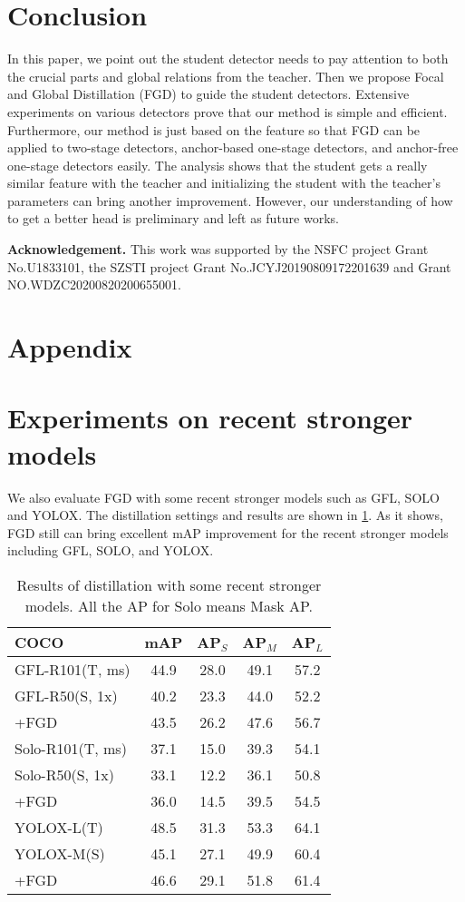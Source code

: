 \documentclass[10pt,twocolumn,letterpaper]{article}
\begin{document}
\section{Conclusion}
\label{sec:conclusion}
In this paper, we point out the student detector needs to pay attention to both the crucial parts and global relations from the teacher. Then we propose Focal and Global Distillation (FGD) to guide the student detectors. Extensive experiments on various detectors prove that our method is simple and efficient. Furthermore, our method is just based on the feature so that FGD can be applied to two-stage detectors, anchor-based one-stage detectors, and anchor-free one-stage detectors easily. The analysis shows that the student gets a really similar feature with the teacher and initializing the student with the teacher's parameters can bring another improvement. However, our understanding of how to get a better head is preliminary and left as future works. 

{\bf Acknowledgement.} This work was supported by the NSFC project Grant No.U1833101, the SZSTI project Grant No.JCYJ20190809172201639 and Grant NO.WDZC20200820200655001.


{\small


}

\clearpage
\appendix
\section*{Appendix}
\section{Experiments on recent stronger models}
We also evaluate FGD with some recent stronger models such as GFL\cite{li2020generalized}, SOLO\cite{wang2020solo} and YOLOX\cite{ge2021yolox}. The distillation settings and results are shown in \cref{table:extra results}. As it shows, FGD still can bring excellent mAP improvement for the recent stronger models including GFL, SOLO, and YOLOX.
\begin{table}
  \centering
  \begin{tabular}{l|cccc}
    \toprule
    {\bf COCO} & mAP & AP$_{S}$ & AP$_{M}$ & AP$_{L}$\\
    \midrule
    GFL-R101(T, ms) & 44.9 &28.0&49.1&57.2\\
    GFL-R50(S, 1x) & 40.2 &23.3&44.0&52.2\\
    +FGD & 43.5&26.2&47.6&56.7 \\
    \midrule
    Solo-R101(T, ms) & 37.1 &15.0&39.3&54.1\\
    Solo-R50(S, 1x) & 33.1 &12.2&36.1&50.8\\
    +FGD & 36.0&14.5&39.5&54.5\\
    \midrule
    YOLOX-L(T) & 48.5 &31.3&53.3&64.1\\
    YOLOX-M(S) & 45.1 &27.1&49.9&60.4\\
    +FGD & 46.6&29.1&51.8&61.4\\
    \bottomrule
  \end{tabular}
  \caption{Results of distillation with some recent stronger models. All the AP for Solo means Mask AP.}
 \label{table:extra results}
\end{table}
\end{document}
